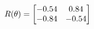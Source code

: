 \documentclass[preview]{standalone}
\begin{document}
\begin{align*}
\special{dvisvgm:raw <g id='unique000'>}R(\theta) = \begin{bmatrix}-0.54 & 0.84\\-0.84 & -0.54\end{bmatrix}\special{dvisvgm:raw </g>}
\end{align*}
\end{document}
